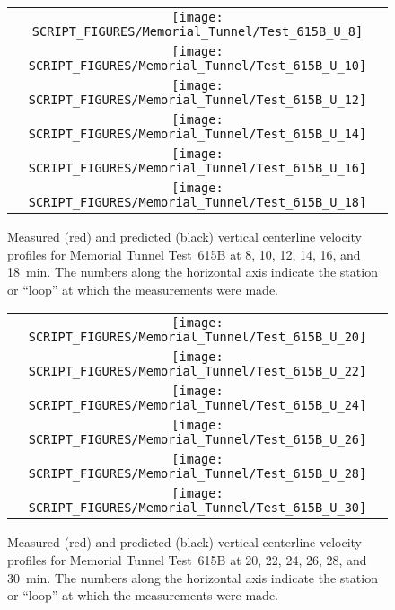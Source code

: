 \begin{figure}[p]
\begin{tabular*}{\textwidth}{c}
\texttt{[image: SCRIPT\_FIGURES/Memorial\_Tunnel/Test\_615B\_U\_8]} \\
\texttt{[image: SCRIPT\_FIGURES/Memorial\_Tunnel/Test\_615B\_U\_10]} \\
\texttt{[image: SCRIPT\_FIGURES/Memorial\_Tunnel/Test\_615B\_U\_12]} \\
\texttt{[image: SCRIPT\_FIGURES/Memorial\_Tunnel/Test\_615B\_U\_14]} \\
\texttt{[image: SCRIPT\_FIGURES/Memorial\_Tunnel/Test\_615B\_U\_16]} \\
\texttt{[image: SCRIPT\_FIGURES/Memorial\_Tunnel/Test\_615B\_U\_18]}
\end{tabular*}
\caption[Memorial Tunnel experiments, velocity profiles, Test 615B, 8-18 min]{Measured (red) and predicted (black) vertical centerline velocity profiles for Memorial Tunnel Test~615B at 8, 10, 12, 14, 16, and 18~min. The numbers along the horizontal axis indicate the station or ``loop'' at which the measurements were made.}
\label{Memorial_615B_U_8-18}
\end{figure}

\begin{figure}[p]
\begin{tabular*}{\textwidth}{c}
\texttt{[image: SCRIPT\_FIGURES/Memorial\_Tunnel/Test\_615B\_U\_20]} \\
\texttt{[image: SCRIPT\_FIGURES/Memorial\_Tunnel/Test\_615B\_U\_22]} \\
\texttt{[image: SCRIPT\_FIGURES/Memorial\_Tunnel/Test\_615B\_U\_24]} \\
\texttt{[image: SCRIPT\_FIGURES/Memorial\_Tunnel/Test\_615B\_U\_26]} \\
\texttt{[image: SCRIPT\_FIGURES/Memorial\_Tunnel/Test\_615B\_U\_28]} \\
\texttt{[image: SCRIPT\_FIGURES/Memorial\_Tunnel/Test\_615B\_U\_30]}
\end{tabular*}
\caption[Memorial Tunnel experiments, velocity profiles, Test 615B, 20-30 min]{Measured (red) and predicted (black) vertical centerline velocity profiles for Memorial Tunnel Test~615B at 20, 22, 24, 26, 28, and 30~min. The numbers along the horizontal axis indicate the station or ``loop'' at which the measurements were made.}
\label{Memorial_615B_U_20-30}
\end{figure}


